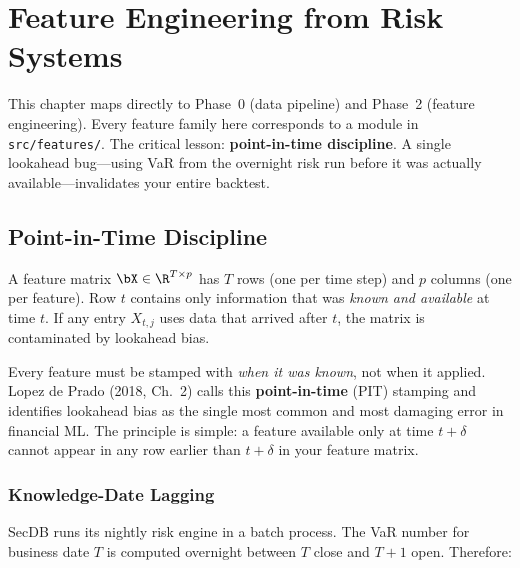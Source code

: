 
\chapter{Feature Engineering from Risk Systems}
\label{ch:features}

\begin{projectconnection}
This chapter maps directly to Phase~0 (data pipeline) and Phase~2
(feature engineering).  Every feature family here corresponds to a
module in \texttt{src/features/}.  The critical lesson: \textbf{point-in-time
discipline}.  A single lookahead bug---using VaR from the overnight risk
run before it was actually available---invalidates your entire backtest.
\end{projectconnection}


\section{Point-in-Time Discipline}
\label{sec:pit}

\begin{prereq}
A feature matrix $\bX \in \R^{T \times p}$ has $T$ rows (one per time
step) and $p$ columns (one per feature).  Row $t$ contains only
information that was \emph{known and available} at time $t$.  If any
entry $X_{t,j}$ uses data that arrived after $t$, the matrix is
contaminated by lookahead bias.
\end{prereq}

Every feature must be stamped with \emph{when it was known}, not when
it applied.  Lopez de Prado (2018, Ch.~2) calls this
\textbf{point-in-time} (PIT) stamping and identifies lookahead bias as
the single most common and most damaging error in financial ML.
The principle is simple: a feature available only at time $t+\delta$
cannot appear in any row earlier than $t+\delta$ in your feature
matrix.

\subsection{Knowledge-Date Lagging}

SecDB runs its nightly risk engine in a batch process.  The VaR number
for business date $T$ is computed overnight between $T$ close and $T+1$
open.  Therefore:

